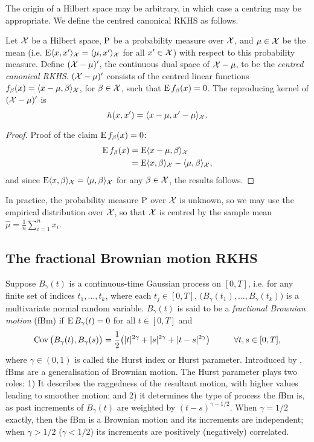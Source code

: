 \documentclass[a4paper,showframe,11pt,draft]{report}
\begin{document}
The origin of a Hilbert space may be arbitrary, in which case a centring may be appropriate.
We define the centred canonical RKHS as follows.

\begin{definition}
  Let ${\mathcal X}$ be a Hilbert space, $\operatorname{P}$ be a probability measure over ${\mathcal X}$, and $\mu\in{\mathcal X}$ be the mean (i.e. $\operatorname{E}\langle x,x'\rangle_{{\mathcal X}}  = \langle\mu,x'\rangle_{{\mathcal X}}$ for all $x' \in {\mathcal X}$) with respect to this probability measure.
  Define $({\mathcal X} - \mu)'$, the continuous dual space of ${\mathcal X} - \mu$, to be the \emph{centred canonical RKHS}.
  $({\mathcal X} - \mu)'$ consists of the centred linear functions $f_\beta(x)=\langle x-\mu,\beta\rangle_{\mathcal X}$, for $\beta\in{\mathcal X}$, such that $\operatorname{E} f_\beta(x) = 0$.
  The reproducing kernel of $({\mathcal X} - \mu)'$ is
  \[
    h(x,x') = \langle x-\mu,x'-\mu\rangle_{\mathcal X}.
  \]
\end{definition}

\begin{proof}
  Proof of the claim $\operatorname{E} f_\beta(x) = 0$:
  \begin{align*}
    \operatorname{E} f_\beta(x) 
    &= \operatorname{E} \langle x-\mu,\beta\rangle_{\mathcal X} \\
    &= \operatorname{E} \langle x,\beta\rangle_{\mathcal X} - \langle\mu,\beta\rangle_{\mathcal X},
  \end{align*}
  and since $\operatorname{E} \langle x,\beta\rangle_{\mathcal X} = \langle\mu,\beta\rangle_{\mathcal X}$ for any $\beta\in{\mathcal X}$, the results follows.
\end{proof}

\begin{remark}
  In practice, the probability measure $\operatorname{P}$ over ${\mathcal X}$ is unknown, so we may use the empirical distribution over ${\mathcal X}$, so that ${\mathcal X}$ is centred by the sample mean $\hat\mu = \frac{1}{n}\sum_{i=1}^n x_i$.  
\end{remark}


\subsection{The fractional Brownian motion RKHS}

Suppose $B_\gamma(t)$ is a continuous-time Gaussian process on $[0,T]$, i.e. for any finite set of indices $t_1,\dots,t_k$, where each $t_j \in [0,T]$, $\big(B_\gamma(t_1),\dots,B_\gamma(t_k)\big)$ is a multivariate normal random variable.
$B_\gamma(t)$ is said to be a \emph{fractional Brownian motion} (fBm) if $\operatorname{E} B_\gamma(t) = 0$ for all $t \in [0,T]$ and 
\[
  \operatorname{Cov}\big(B_\gamma(t),B_\gamma(s) \big) = \frac{1}{2}\big( |t|^{2\gamma} + |s|^{2\gamma} + |t-s|^{2\gamma} \big) \hspace{1cm} \forall t,s \in [0,T],
\]
where $\gamma \in (0,1)$ is called the Hurst index or Hurst parameter.
Introduced by \citet{mandelbrot1968fractional}, fBms are a generalisation of Brownian motion.
The Hurst parameter plays two roles: 1) It describes the raggedness of the resultant motion, with higher values leading to smoother motion; and 2) it determines the type of process the fBm is, as past increments of $B_\gamma(t)$ are weighted by $(t-s)^{\gamma-1/2}$.
When $\gamma=1/2$ exactly, then the fBm is a Brownian motion and its increments are independent; when $\gamma > 1/2$ ($\gamma < 1/2$) its increments are positively (negatively) correlated.
\end{document}
